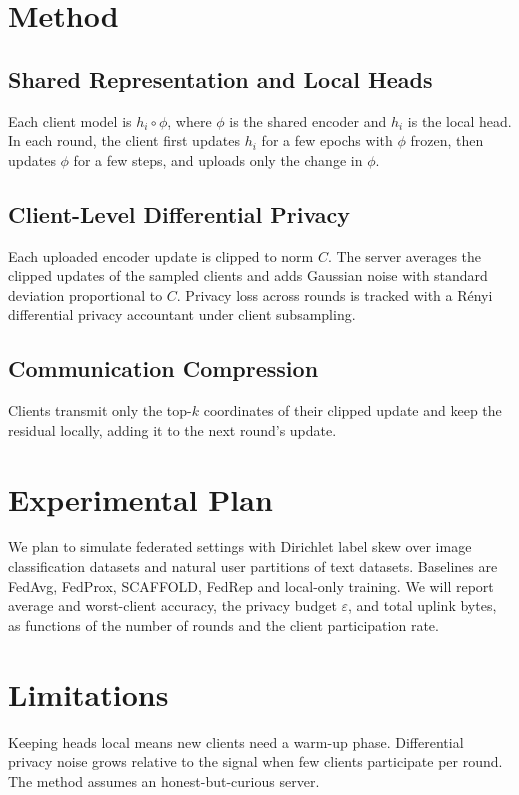 \documentclass{article}
\begin{document}
\section{Method}
\subsection{Shared Representation and Local Heads}
Each client model is $h_i \circ \phi$, where $\phi$ is the shared encoder and
$h_i$ is the local head. In each round, the client first updates $h_i$ for a few
epochs with $\phi$ frozen, then updates $\phi$ for a few steps, and uploads only
the change in $\phi$.

\subsection{Client-Level Differential Privacy}
Each uploaded encoder update is clipped to norm $C$. The server averages the
clipped updates of the sampled clients and adds Gaussian noise with standard
deviation proportional to $C$. Privacy loss across rounds is tracked with a
R\'enyi differential privacy accountant under client subsampling.

\subsection{Communication Compression}
Clients transmit only the top-$k$ coordinates of their clipped update and keep
the residual locally, adding it to the next round's update.

\section{Experimental Plan}
We plan to simulate federated settings with Dirichlet label skew over image
classification datasets and natural user partitions of text datasets.
Baselines are FedAvg, FedProx, SCAFFOLD, FedRep and local-only training. We
will report average and worst-client accuracy, the privacy budget
$\varepsilon$, and total uplink bytes, as functions of the number of rounds and
the client participation rate.

\section{Limitations}
Keeping heads local means new clients need a warm-up phase. Differential
privacy noise grows relative to the signal when few clients participate per
round. The method assumes an honest-but-curious server.
\end{document}
